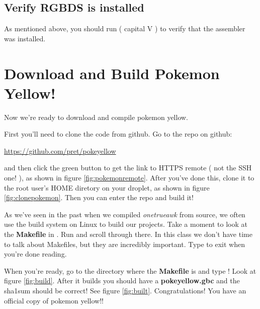\documentclass[12pt,a4]{article}
\begin{document}

\subsection{Verify RGBDS is installed}
As mentioned above, you should run  ( capital V ) to verify that the assembler was installed.

\clearpage

\section{Download and Build Pokemon Yellow!}
Now we're ready to download and compile pokemon yellow.

First you'll need to clone the code from github. Go to the repo on github:

\begin{center}
\href{https://github.com/pret/pokeyellow}{https://github.com/pret/pokeyellow}
\end{center}

and then click the green button to get the link to HTTPS remote ( not the SSH one! ), as shown in figure \ref{fig:pokemonremote}. After you've done this, clone it to the root user's HOME diretory on your droplet, as shown in figure \ref{fig:clonepokemon}. Then you can enter the repo and build it!


As we've seen in the past when we compiled \textit{onetrueawk} from  source, we often use the  build system on Linux to build our projects. Take a moment to look at the \textbf{Makefile} in . Run  and scroll through there. In this class we don't have time to talk about Makefiles, but they are incredibly important. Type  to exit  when you're done reading.

When you're ready, go to the directory where the \textbf{Makefile} is and type ! Look at figure \ref{fig:build}. After it builds you should have a \textbf{pokeyellow.gbc} and the sha1sum should be correct! See figure \ref{fig:built}. Congratulations! You have an official copy of pokemon yellow!!
\end{document}
